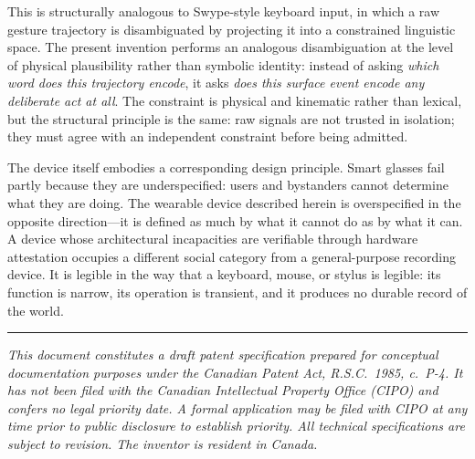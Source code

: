 \documentclass[11pt,letterpaper]{article}
\begin{document}
This is structurally analogous to Swype-style keyboard input, in which a raw gesture
trajectory is disambiguated by projecting it into a constrained linguistic space. The
present invention performs an analogous disambiguation at the level of physical
plausibility rather than symbolic identity: instead of asking \emph{which word does
this trajectory encode}, it asks \emph{does this surface event encode any deliberate
act at all}. The constraint is physical and kinematic rather than lexical, but the
structural principle is the same: raw signals are not trusted in isolation; they must
agree with an independent constraint before being admitted.

The device itself embodies a corresponding design principle. Smart glasses fail
partly because they are underspecified: users and bystanders cannot determine what
they are doing. The wearable device described herein is overspecified in the opposite
direction---it is defined as much by what it cannot do as by what it can. A device
whose architectural incapacities are verifiable through hardware attestation occupies
a different social category from a general-purpose recording device. It is legible
in the way that a keyboard, mouse, or stylus is legible: its function is narrow,
its operation is transient, and it produces no durable record of the world.

\vspace{24pt}
\hrule
\vspace{8pt}
\noindent\small\textit{This document constitutes a draft patent specification
prepared for conceptual documentation purposes under the Canadian Patent Act,
R.S.C.\ 1985, c.~P-4. It has not been filed with the Canadian Intellectual Property
Office (CIPO) and confers no legal priority date. A formal application may be filed
with CIPO at any time prior to public disclosure to establish priority. All technical
specifications are subject to revision. The inventor is resident in Canada.}
\end{document}
